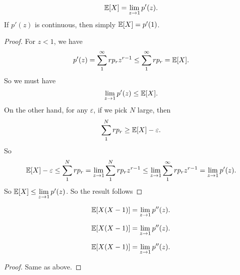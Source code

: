 %
\begin{note}
  \begin{field}
    \begin{thm}
      \[
        \mathbb{E}[X] = \lim_{z\to 1}p'(z).
      \]
      If $p'(z)$ is continuous, then simply $\mathbb{E}[X] = p'(1)$.
    \end{thm}
  \end{field}
  \begin{field}
    \begin{proof}
      For $z < 1$, we have
      \[
        p'(z) = \sum_1^\infty rp_r z^{r - 1} \leq \sum_1^\infty rp_r = \mathbb{E}[X].
      \]
      So we must have
      \[
        \lim_{z\to 1}p'(z) \leq \mathbb{E}[X].
      \]
      On the other hand, for any $\varepsilon$, if we pick $N$ large, then
      \[
        \sum_{1}^N rp_r \geq \mathbb{E}[X] - \varepsilon.
      \]
      So
      \[
        \mathbb{E}[X] - \varepsilon \leq \sum_1^N rp_r = \lim_{z\to 1}\sum _1^N rp_r z^{r - 1}\leq \lim_{z \to 1} \sum_1^\infty rp_r z^{r - 1} = \lim_{z\to 1} p' (z).
      \]
      So $\mathbb{E}[X] \leq \lim\limits_{z \to 1}p'(z)$. So the result follows
    \end{proof}
  \end{field}
  \xplain{}%
\end{note}

\begin{note}
  \begin{field}
    \begin{thm}
      \[
        \mathbb{E}[X(X - 1)] = \lim_{z \to 1}p''(z).
      \]
    \end{thm}
  \end{field}
  \begin{field}
    \begin{thm}
      \[
        \mathbb{E}[X(X - 1)] = \lim_{z \to 1}p''(z).
      \]
    \end{thm}
  \end{field}
  \xplain{}%
\end{note}

%
\begin{note}
  \begin{field}
    \begin{thm}
      \[
        \mathbb{E}[X(X - 1)] = \lim_{z \to 1}p''(z).
      \]
    \end{thm}
  \end{field}
  \begin{field}
    \begin{proof}
      Same as above.
    \end{proof}
  \end{field}
  \xplain{}%
\end{note}

